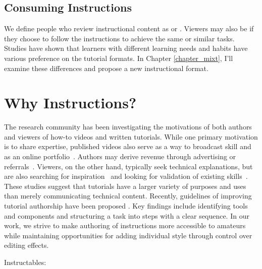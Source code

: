 
\subsection{Consuming Instructions}
We define people who review instructional content as  or . Viewers may also be  if they choose to follow the instructions to achieve the same or similar tasks.
%
Studies have shown that learners with different learning needs and habits have various preference on the tutorial formats. In Chapter \ref{chapter_mixt}, I'll examine these differences and propose a new instructional format.



\section{Why Instructions?}
\label{background_why}

The research community has been investigating the motivations of both authors and viewers of how-to videos and written tutorials. While one primary motivation is to share expertise, published videos also serve as a way to broadcast skill and as an online portfolio~\cite{Torrey:2007he,Kuznetsov:2010:REA:1868914.1868950}. Authors may derive revenue through advertising or referrals~\cite{Lafreniere:2012tl}. Viewers, on the other hand, typically seek technical explanations, but are also searching for inspiration~\cite{Torrey:2009fc} and looking for validation of existing skills~\cite{Lafreniere:2012tl}.
%
These studies suggest that tutorials have a larger variety of purposes and uses than merely communicating technical content. Recently, guidelines of improving tutorial authorship have been proposed \cite{Wakkary:2015:TAH:2702123.2702550}. Key findings include identifying tools and components and structuring a task into steps with a clear sequence. In our work, we strive to make authoring of instructions more accessible to amateurs while maintaining opportunities for adding individual style through control over editing effects.

Instructables: \cite{Tseng:2014:PVP:2598510.2598540}


